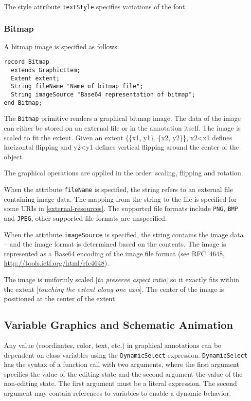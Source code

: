 The style attribute \lstinline!textStyle! specifies variations of the font.

\subsubsection{Bitmap}

A bitmap image is specified as follows:

\begin{lstlisting}[language=modelica]
record Bitmap
  extends GraphicItem;
  Extent extent;
  String fileName "Name of bitmap file";
  String imageSource "Base64 representation of bitmap";
end Bitmap;
\end{lstlisting}
The \lstinline!Bitmap! primitive renders a graphical bitmap image. The data of the
image can either be stored on an external file or in the annotation
itself. The image is scaled to fit the extent. Given an extent \{\{x1,
y1\}, \{x2, y2\}\}, x2\textless{}x1 defines horizontal flipping and
y2\textless{}y1 defines vertical flipping around the center of the
object.

The graphical operations are applied in the order: scaling, flipping and
rotation.

When the attribute \lstinline!fileName! is specified, the string refers to an
external file containing image data. The mapping from the string to the
file is specified for some URIs in \autoref{external-resources}. The supported file
formats include \lstinline!PNG!, \lstinline!BMP! and \lstinline!JPEG!, other supported file formats are
unspecified.

When the attribute \lstinline!imageSource! is specified, the string contains the
image data -- and the image format is determined based on the contents.
The image is represented as a Base64 encoding of the image file format
(see RFC~4648, \url{http://tools.ietf.org/html/rfc4648}).

The image is uniformly scaled {[}\emph{to preserve aspect ratio}{]} so
it exactly fits within the extent {[}\emph{touching the extent along one
axis}{]}. The center of the image is positioned at the center of the
extent.

\subsection{Variable Graphics and Schematic Animation}

Any value (coordinates, color, text, etc.) in graphical annotations can
be dependent on class variables using the \lstinline!DynamicSelect! expression.
\lstinline!DynamicSelect! has the syntax of a function call with two arguments,
where the first argument specifies the value of the editing state and
the second argument the value of the non-editing state. The first
argument must be a literal expression. The second argument may contain
references to variables to enable a dynamic behavior.

